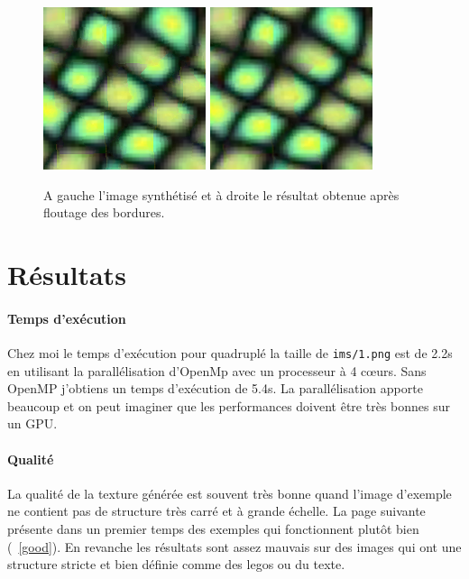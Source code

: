 \documentclass[12pt]{article}
\begin{document}
\begin{figure}
	\centering
	\includegraphics[scale=3]{bordure.png}
	\quad
	\includegraphics[scale=3]{flou.png}
	\captionsetup{justification=centering}
	\caption{A gauche l'image synthétisé et à droite le résultat obtenue après floutage des bordures.}
	\label{petit}
\end{figure}

\section{Résultats}

\paragraph{Temps d'exécution}
Chez moi le temps d'exécution pour quadruplé la taille de \verb|ims/1.png| est de 2.2s en utilisant la parallélisation d'OpenMp avec un processeur à 4 cœurs. Sans OpenMP j'obtiens un temps d'exécution de 5.4s. La parallélisation apporte beaucoup et on peut imaginer que les performances doivent être très bonnes sur un GPU.

\paragraph{Qualité}
La qualité de la texture générée est souvent très bonne quand l'image d'exemple ne contient pas de structure très carré et à grande échelle. La page suivante présente dans un premier temps des exemples qui fonctionnent plutôt bien (\figurename~\ref{good}). En revanche les résultats sont assez mauvais sur des images qui ont une structure stricte et bien définie comme des legos ou du texte.
\end{document}
